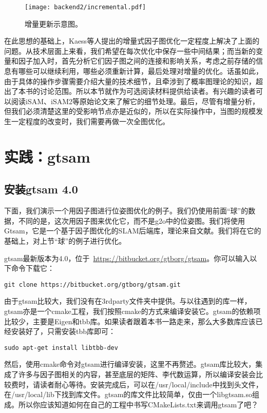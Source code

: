 \begin{figure}[!htp]
	\centering
	\texttt{[image: backend2/incremental.pdf]}
	\caption{增量更新示意图。}
	\label{fig:incremental}
\end{figure}

在此思想的基础上，Kaess等人提出的增量式因子图优化一定程度上解决了上面的问题。从技术层面上来看，我们希望在每次优化中保存一些中间结果；而当新的变量和因子加入时，首先分析它们因子图之间的连接和影响关系，考虑之前存储的信息有哪些可以继续利用，哪些必须重新计算，最后处理对增量的优化。话虽如此，由于具体的操作步骤需要介绍大量的技术细节，且牵涉到了概率图理论的知识，超出了本书的讨论范围。所以本节就作为可选阅读材料提供给读者。有兴趣的读者可以阅读iSAM、iSAM2等原始论文来了解它的细节处理。最后，尽管有增量分析，但我们必须清楚这里的受影响节点亦是近似的，所以在实际操作中，当图的规模发生一定程度的改变时，我们需要再做一次全图优化。

\section{\textsuperscript{\ttfamily *}实践：gtsam}
\subsection{安装gtsam 4.0}
下面，我们演示一个用因子图进行位姿图优化的例子。我们仍使用前面“球”的数据，不同的是，这次用因子图来优化它，而不是g2o中的位姿图。我们将使用Gtsam\textsuperscript{\cite{Dellaert2012}}，它是一个基于因子图优化的SLAM后端库，理论来自文献\cite{Kaess2008, Kaess2011}。我们将在它的基础上，对上节“球”的例子进行优化。

gtsam最新版本为4.0，位于~\url{https://bitbucket.org/gtborg/gtsam}。你可以输入以下命令下载它：
\begin{lstlisting}
git clone https://bitbucket.org/gtborg/gtsam.git
\end{lstlisting}
由于gtsam比较大，我们没有在3rdparty文件夹中提供。与以往遇到的库一样，gtsam亦是一个cmake工程，我们按照cmake的方式来编译安装它。gtsam的依赖项比较少，主要是Eigen和tbb库。如果读者跟着本书一路走来，那么大多数库应该已经安装好了，只需安装tbb库即可：
\begin{lstlisting}
sudo apt-get install libtbb-dev
\end{lstlisting}

然后，使用cmake命令对gtsam进行编译安装，这里不再赘述。gtsam库比较大，集成了许多与因子图相关的内容，甚至底层的矩阵、李代数运算，所以编译安装会比较费时，请读者耐心等待。安装完成后，可以在/usr/local/include中找到头文件，在/usr/local/lib下找到库文件。gtsam的库文件比较简单，仅由一个libgtsam.so组成。所以你应该知道如何在自己的工程中书写CMakeLists.txt来调用gtsam了吧？

